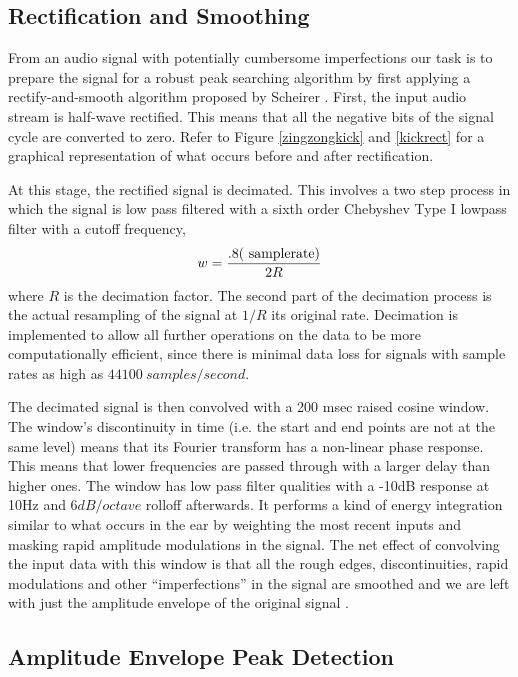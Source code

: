\vspace{5mm}
\subsection{Rectification and Smoothing}

From an audio signal with potentially cumbersome imperfections our task is to prepare 
the signal for a robust peak searching algorithm by first applying a
rectify-and-smooth algorithm proposed by Scheirer \cite{Scheirer:98tempo}.
First, the input audio stream is half-wave rectified. This means that all the
negative bits of the signal cycle are converted to zero. Refer to
Figure \ref{zingzongkick} and \ref{kickrect} for a graphical representation of
what occurs before and after rectification.

At this stage, the rectified signal is decimated. This involves a two
step process in which the signal is low pass filtered with a sixth
order Chebyshev Type I lowpass filter with a cutoff frequency,
$$w = {.8(\hbox{ samplerate}) \over 2R}$$ where $R$ is the decimation factor. The
second part of the decimation process is the actual resampling of the
signal at $1/R$ its original rate.  Decimation is implemented to allow
all further operations on the data to be more computationally
efficient, since there is minimal data loss for signals with sample
rates as high as $44100 \ samples/second$.

The decimated signal is then convolved with a 200 msec raised cosine 
window.  The window's discontinuity in time (i.e. the start and end 
points are not at the same level) means that its Fourier transform 
has a non-linear phase response. This means that lower frequencies are 
passed through with a larger delay than higher ones.  The window
has low pass filter qualities with a -10dB response at 10Hz and $6
dB/octave$ rolloff afterwards. It performs a kind of energy integration
similar to what occurs in the ear by weighting the most recent inputs
and masking rapid amplitude modulations in the signal.  The net effect
of convolving the input data with this window is that all the rough 
edges, discontinuities, rapid modulations and other ``imperfections'' 
in the signal are smoothed and we are left with just the amplitude 
envelope of the original signal \cite{Scheirer:98tempo}. 


\vspace{5mm}
\subsection{Amplitude Envelope Peak Detection}

